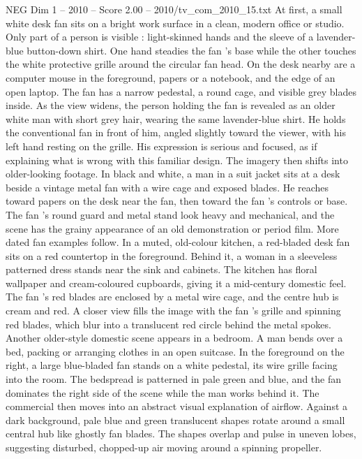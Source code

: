 \begin{textsample}{NEG Dim 1 – 2010 – Score 2.00 – 2010/tv\_com\_2010\_15.txt}  \label{ex:f1_neg_080}
At first, a small white desk fan sits on a bright work surface in a clean, modern office or studio.
Only part of a person is visible : light-skinned hands and the sleeve of a lavender-blue button-down shirt.
One hand steadies the fan ’s base while the other touches the white protective grille around the circular fan head.
On the desk nearby are a computer mouse in the foreground, papers or a notebook, and the edge of an open laptop.
The fan has a narrow pedestal, a round cage, and visible grey blades inside.
As the view widens, the person holding the fan is revealed as an older white man with short grey hair, wearing the same lavender-blue shirt.
He holds the conventional fan in front of him, angled slightly toward the viewer, with his left hand resting on the grille.
His expression is serious and focused, as if explaining what is wrong with this familiar design.
The imagery then shifts into older-looking footage.
In black and white, a man in a suit jacket sits at a desk beside a vintage metal fan with a wire cage and exposed blades.
He reaches toward papers on the desk near the fan, then toward the fan ’s controls or base.
The fan ’s round guard and metal stand look heavy and mechanical, and the scene has the grainy appearance of an old demonstration or period film.
More dated fan examples follow.
In a muted, old-colour kitchen, a red-bladed desk fan sits on a red countertop in the foreground.
Behind it, a woman in a sleeveless patterned dress stands near the sink and cabinets.
The kitchen has floral wallpaper and cream-coloured cupboards, giving it a mid-century domestic feel.
The fan ’s red blades are enclosed by a metal wire cage, and the centre hub is cream and red.
A closer view fills the image with the fan ’s grille and spinning red blades, which blur into a translucent red circle behind the metal spokes.
Another older-style domestic scene appears in a bedroom.
A man bends over a bed, packing or arranging clothes in an open suitcase.
In the foreground on the right, a large blue-bladed fan stands on a white pedestal, its wire grille facing into the room.
The bedspread is patterned in pale green and blue, and the fan dominates the right side of the scene while the man works behind it.
The commercial then moves into an abstract visual explanation of airflow.
Against a dark background, pale blue and green translucent shapes rotate around a small central hub like ghostly fan blades.
The shapes overlap and pulse in uneven lobes, suggesting disturbed, chopped-up air moving around a spinning propeller.

\end{textsample}
